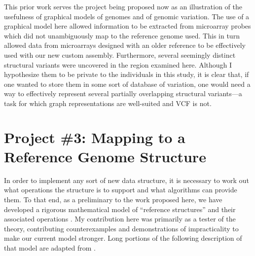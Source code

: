 \documentclass[11pt,proposal]{ucthesis}
\begin{document}
This prior work serves the project being proposed now as an illustration of the usefulness of graphical models of genomes and of genomic variation. The use of a graphical model here allowed information to be extracted from microarray probes which did not unambiguously map to the reference genome used. This in turn allowed data from microarrays designed with an older reference to be effectively used with our new custom assembly. Furthermore, several seemingly distinct structural variants were uncovered in the region examined here. Although I hypothesize them to be private to the individuals in this study, it is clear that, if one wanted to store them in some sort of database of variation, one would need a way to effectively represent several partially overlapping structural variants---a task for which graph representations are well-suited and VCF is not.



    
    
        
    


\section{Project \#3: Mapping to a Reference Genome Structure}
\label{sec:mapping}

In order to implement any sort of new data structure, it is necessary to work out what operations the structure is to support and what algorithms can provide them. To that end, as a preliminary to the work proposed here, we have developed a rigorous mathematical model of ``reference structures'' and their associated operations \cite{paten2014mapping}. My contribution here was primarily as a tester of the theory, contributing counterexamples and demonstrations of impracticality to make our current model stronger. Long portions of the following description of that model are adapted from \cite{paten2014mapping}. 
\end{document}
